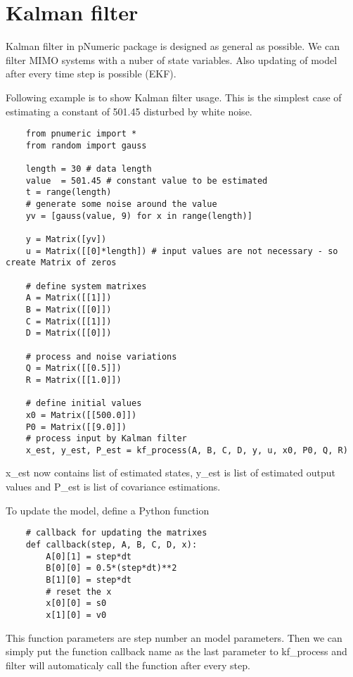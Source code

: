 \documentclass{article}
\begin{document}
\section{Kalman filter \label{kalmanfilter}}
    Kalman filter in pNumeric package is designed as general as possible. We can 
    filter MIMO systems with a nuber of state variables. Also updating of
    model after every time step is possible (EKF).
    
    Following example is to show Kalman filter usage. This is the simplest case of
    estimating a constant of 501.45 disturbed by white noise.
    \begin{verbatim}
    from pnumeric import *
    from random import gauss
    
    length = 30 # data length
    value  = 501.45 # constant value to be estimated
    t = range(length)
    # generate some noise around the value
    yv = [gauss(value, 9) for x in range(length)]
    
    y = Matrix([yv])
    u = Matrix([[0]*length]) # input values are not necessary - so create Matrix of zeros
    
    # define system matrixes
    A = Matrix([[1]])
    B = Matrix([[0]])
    C = Matrix([[1]])
    D = Matrix([[0]])
    
    # process and noise variations
    Q = Matrix([[0.5]])
    R = Matrix([[1.0]])
    
    # define initial values
    x0 = Matrix([[500.0]])
    P0 = Matrix([[9.0]])
    # process input by Kalman filter
    x_est, y_est, P_est = kf_process(A, B, C, D, y, u, x0, P0, Q, R)
    \end{verbatim}
    
    x_est now contains list of estimated states, y_est is list of estimated output values and P_est
    is list of covariance estimations.
    
    To update the model, define a Python function
    \begin{verbatim}
    # callback for updating the matrixes
    def callback(step, A, B, C, D, x):
        A[0][1] = step*dt
        B[0][0] = 0.5*(step*dt)**2
        B[1][0] = step*dt
        # reset the x
        x[0][0] = s0
        x[1][0] = v0
    \end{verbatim}
    
    This function parameters are step number an model parameters.
    Then we can simply put the function callback name as the last parameter to kf_process
    and filter will automaticaly call the function after every step.
\end{document}
